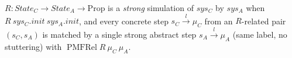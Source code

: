 \begin{definition}
  \label{def:strongsim}
  \leanok
  $R : State_C \to State_A \to \mathrm{Prop}$ is a \emph{strong} simulation of
  $sys_C$ by $sys_A$ when $R\ sys_C.init\ sys_A.init$, and every concrete step
  $s_C \xrightarrow{l} \mu_C$ from an $R$-related pair $(s_C, s_A)$ is matched by a
  single strong abstract step $s_A \xrightarrow{l} \mu_A$ (same label, no
  stuttering) with $\operatorname{PMFRel} R\ \mu_C\ \mu_A$.
\end{definition}
